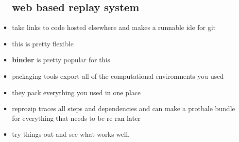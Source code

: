 \documentclass{article}
\begin{document}
\begin{itemize}
\subsection*{web based replay system}
\item take links to code hosted elsewhere and makes a runnable ide for git 
\item this is pretty flexible 
\item \textbf{binder} is pretty popular for this 
\item packaging tools export all of the computational environments you used 
\item they pack everything you used in one place
\item reprozip traces all steps and dependencies and can make a protbale bundle for everything that needs to be re ran later
\item try things out and see what works well. 
\end{itemize}
\end{document}
